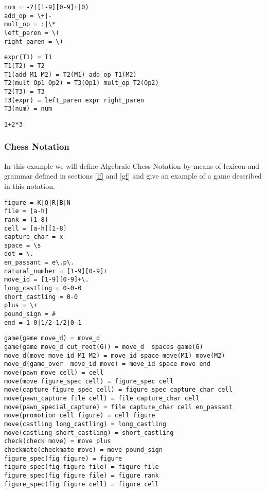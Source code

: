 \documentclass[a4paper,10pt]{article}
\newcounter{subsubsubsection}[subsubsection]
\begin{document}
\label{alex}
\begin{verbatim}
num = -?([1-9][0-9]+|0)
add_op = \+|-
mult_op = :|\*
left_paren = \(
right_paren = \)
\end{verbatim} 
\label{agram}

\begin{verbatim}
expr(T1) = T1
T1(T2) = T2
T1(add M1 M2) = T2(M1) add_op T1(M2)
T2(mult Op1 Op2) = T3(Op1) mult_op T2(Op2)
T2(T3) = T3
T3(expr) = left_paren expr right_paren
T3(num) = num   
\end{verbatim}
 
\label{asf}
\begin{verbatim}
1+2*3
\end{verbatim}
\subsubsection{Chess Notation}
In this example we will define Algebraic Chess Notation \cite{chess} by means of lexicon and grammar defined in sections \ref{lf} and \ref{gf} and give an example of a game described in this notation. 
\label{clex}
\begin{verbatim}
figure = K|Q|R|B|N
file = [a-h]
rank = [1-8]
cell = [a-h][1-8]
capture_char = x
space = \s
dot = \.
en_passant = e\.p\.
natural_number = [1-9][0-9]+
move_id = [1-9][0-9]+\.
long_castling = 0-0-0
short_castling = 0-0
plus = \+
pound_sign = #
end = 1-0|1/2-1/2|0-1
\end{verbatim}
\label{cgram}
\begin{verbatim}
game(game move_d) = move_d 
game(game move_d cut_root(G)) = move_d  spaces game(G)
move_d(move move_id M1 M2) = move_id space move(M1) move(M2)
move_d(game_over  move_id move) = move_id space move end
move(pawn_move cell) = cell
move(move figure_spec cell) = figure_spec cell
move(capture figure_spec cell) = figure_spec capture_char cell
move(pawn_capture file cell) = file capture_char cell
move(pawn_special_capture) = file capture_char cell en_passant
move(promotion cell figure) = cell figure
move(castling long_castling) = long_castling
move(castling short_castling) = short_castling
check(check move) = move plus
checkmate(checkmate move) = move pound_sign
figure_spec(fig figure) = figure
figure_spec(fig figure file) = figure file
figure_spec(fig figure file) = figure rank
figure_spec(fig figure cell) = figure cell
\end{verbatim}
\end{document}
